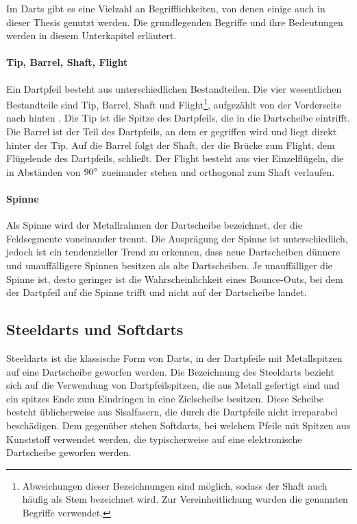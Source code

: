 Im Darts gibt es eine Vielzahl an Begrifflichkeiten, von denen einige auch in dieser Thesis genutzt werden. Die grundlegenden Begriffe und ihre Bedeutungen werden in diesem Unterkapitel erläutert.

\paragraph{Tip, Barrel, Shaft, Flight}

Ein Dartpfeil besteht aus unterschiedlichen Bestandteilen. Die vier wesentlichen Bestandteile sind Tip, Barrel, Shaft und Flight\footnote{Abweichungen dieser Bezeichnungen sind möglich, sodass der Shaft auch häufig als Stem bezeichnet wird. Zur Vereinheitlichung wurden die genannten Begriffe verwendet.}, aufgezählt von der Vorderseite nach hinten \cite{wdf-rules,pdc_rules}. Die Tip ist die Spitze des Dartpfeils, die in die Dartscheibe eintrifft. Die Barrel ist der Teil des Dartpfeils, an dem er gegriffen wird und liegt direkt hinter der Tip. Auf die Barrel folgt der Shaft, der die Brücke zum Flight, dem Flügelende des Dartpfeils, schließt. Der Flight besteht aus vier Einzelflügeln, die in Abständen von $90^{\circ}$ zueinander stehen und orthogonal zum Shaft verlaufen.

\paragraph{Spinne}

Als Spinne wird der Metallrahmen der Dartscheibe bezeichnet, der die Feldsegmente voneinander trennt. Die Ausprägung der Spinne ist unterschiedlich, jedoch ist ein tendenzieller Trend zu erkennen, dass neue Dartscheiben dünnere und unauffälligere Spinnen besitzen als alte Dartscheiben. Je unauffälliger die Spinne ist, desto geringer ist die Wahrscheinlichkeit eines Bounce-Outs, bei dem der Dartpfeil auf die Spinne trifft und nicht auf der Dartscheibe landet.


\subsection{Steeldarts und Softdarts}
\label{sec:steeldarts}

Steeldarts ist die klassische Form von Darts, in der Dartpfeile mit Metallspitzen auf eine Dartscheibe geworfen werden. Die Bezeichnung des Steeldarts bezieht sich auf die Verwendung von Dartpfeilspitzen, die aus Metall gefertigt sind und ein spitzes Ende zum Eindringen in eine Zielscheibe besitzen. Diese Scheibe besteht üblicherweise aus Sisalfasern, die durch die Dartpfeile nicht irreparabel beschädigen. Dem gegenüber stehen Softdarts, bei welchem Pfeile mit Spitzen aus Kunststoff verwendet werden, die typischerweise auf eine elektronische Dartscheibe geworfen werden.

